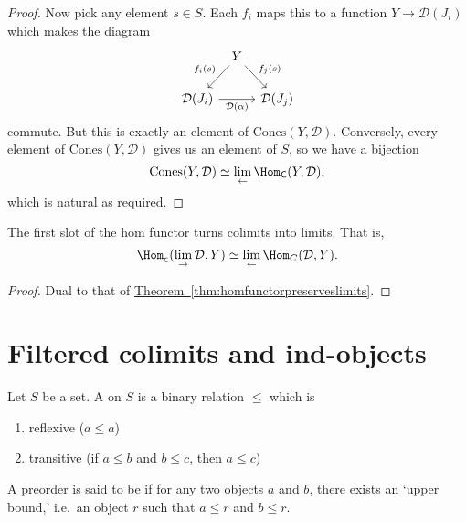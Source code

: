 \documentclass[main.tex]{subfiles}
\begin{document}
\begin{proof}
  Now pick any element $s \in S$. Each $f_{i}$ maps this to a function $Y \to \mathcal{D}(J_{i})$ which makes the diagram
  \begin{equation*}
    \begin{tikzcd}[column sep=tiny]
      & Y
      \arrow[dl, swap, "f_{i}(s)"]
      \arrow[dr, "f_{j}(s)"]
      \\
      \mathcal{D}(J_{i})
      \arrow[rr, swap, "\mathcal{D}(\alpha)"]
      & & \mathcal{D}(J_{j})
    \end{tikzcd}
  \end{equation*}
  commute. But this is exactly an element of $\mathrm{Cones}(Y, \mathcal{D})$. Conversely, every element of $\mathrm{Cones}(Y, \mathcal{D})$ gives us an element of $S$, so we have a bijection
  \begin{equation*}
    \mathrm{Cones}(Y, \mathcal{D}) \simeq \lim_{\leftarrow} \Hom_{\mathsf{C}}(Y, \mathcal{D}),
  \end{equation*}
  which is natural as required.
\end{proof}

\begin{corollary}
  The first slot of the hom functor turns colimits into limits. That is,
  \begin{equation*}
    \Hom_{_\mathsf{C}}(\lim_{\rightarrow}\mathcal{D}, Y) \simeq \lim_{\leftarrow}\Hom_{C}(\mathcal{D}, Y).
  \end{equation*}
\end{corollary}
\begin{proof}
  Dual to that of \hyperref[thm:homfunctorpreserveslimits]{Theorem~\ref*{thm:homfunctorpreserveslimits}}.
\end{proof}



\section{Filtered colimits and ind-objects}

\begin{definition}[preorder]
  \label{def:preorder}
  Let $S$ be a set. A  on $S$ is a binary relation $\leq$ which is
  \begin{enumerate}
    \item reflexive ($a \leq a$)

    \item transitive (if $a \leq b$ and $b \leq c$, then $a \leq c$)
  \end{enumerate}

  A preorder is said to be  if for any two objects $a$ and $b$, there exists an `upper bound,' i.e.\ an object $r$ such that $a \leq r$ and $b \leq r$.
\end{definition}
\end{document}
